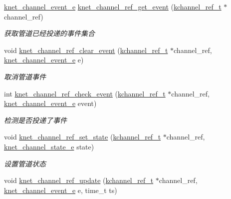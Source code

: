 \begin{DoxyCompactItemize}
\hyperlink{a00051_accd62b4c787cfb91e81aa14210302863_accd62b4c787cfb91e81aa14210302863}{knet\+\_\+channel\+\_\+event\+\_\+e} \hyperlink{a00049_a8fa7b957151c8dd347d1fbedfea475e5_a8fa7b957151c8dd347d1fbedfea475e5}{knet\+\_\+channel\+\_\+ref\+\_\+get\+\_\+event} (\hyperlink{a00051_a3b7e82599367eade261456f60ebe2cd9_a3b7e82599367eade261456f60ebe2cd9}{kchannel\+\_\+ref\+\_\+t} $\ast$channel\+\_\+ref)
\begin{DoxyCompactList}\small\item\em 获取管道已经投递的事件集合 \end{DoxyCompactList}\item 
void \hyperlink{a00049_ac9f005bb64c11a6cf94a0809aa4e0866_ac9f005bb64c11a6cf94a0809aa4e0866}{knet\+\_\+channel\+\_\+ref\+\_\+clear\+\_\+event} (\hyperlink{a00051_a3b7e82599367eade261456f60ebe2cd9_a3b7e82599367eade261456f60ebe2cd9}{kchannel\+\_\+ref\+\_\+t} $\ast$channel\+\_\+ref, \hyperlink{a00051_accd62b4c787cfb91e81aa14210302863_accd62b4c787cfb91e81aa14210302863}{knet\+\_\+channel\+\_\+event\+\_\+e} e)
\begin{DoxyCompactList}\small\item\em 取消管道事件 \end{DoxyCompactList}\item 
int \hyperlink{a00049_ab88ee14b4ea5633be7e4e46c622a40d3_ab88ee14b4ea5633be7e4e46c622a40d3}{knet\+\_\+channel\+\_\+ref\+\_\+check\+\_\+event} (\hyperlink{a00051_a3b7e82599367eade261456f60ebe2cd9_a3b7e82599367eade261456f60ebe2cd9}{kchannel\+\_\+ref\+\_\+t} $\ast$channel\+\_\+ref, \hyperlink{a00051_accd62b4c787cfb91e81aa14210302863_accd62b4c787cfb91e81aa14210302863}{knet\+\_\+channel\+\_\+event\+\_\+e} event)
\begin{DoxyCompactList}\small\item\em 检测是否投递了事件 \end{DoxyCompactList}\item 
void \hyperlink{a00049_aff3748511b10f9d9df9375c5d816eb37_aff3748511b10f9d9df9375c5d816eb37}{knet\+\_\+channel\+\_\+ref\+\_\+set\+\_\+state} (\hyperlink{a00051_a3b7e82599367eade261456f60ebe2cd9_a3b7e82599367eade261456f60ebe2cd9}{kchannel\+\_\+ref\+\_\+t} $\ast$channel\+\_\+ref, \hyperlink{a00051_a74ff83eaafca5c7093accdc65c6b0646_a74ff83eaafca5c7093accdc65c6b0646}{knet\+\_\+channel\+\_\+state\+\_\+e} state)
\begin{DoxyCompactList}\small\item\em 设置管道状态 \end{DoxyCompactList}\item 
void \hyperlink{a00049_a011250f757798988f6da99b53c74e9c8_a011250f757798988f6da99b53c74e9c8}{knet\+\_\+channel\+\_\+ref\+\_\+update} (\hyperlink{a00051_a3b7e82599367eade261456f60ebe2cd9_a3b7e82599367eade261456f60ebe2cd9}{kchannel\+\_\+ref\+\_\+t} $\ast$channel\+\_\+ref, \hyperlink{a00051_accd62b4c787cfb91e81aa14210302863_accd62b4c787cfb91e81aa14210302863}{knet\+\_\+channel\+\_\+event\+\_\+e} e, time\+\_\+t ts)

\end{DoxyCompactItemize}
